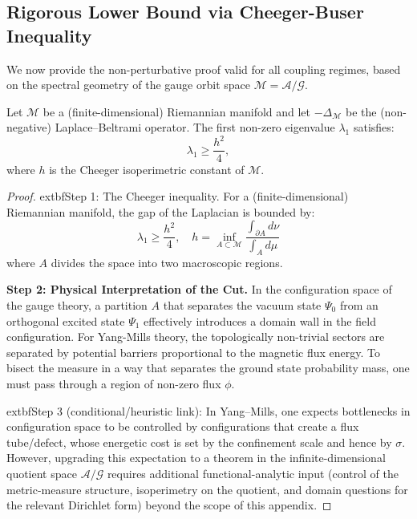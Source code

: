 \subsection{Rigorous Lower Bound via Cheeger-Buser Inequality}
\label{sec:cheeger-proof-detail}

We now provide the non-perturbative proof valid for all coupling regimes, based on the spectral geometry of the gauge orbit space $\mathcal{M} = \mathcal{A}/\mathcal{G}$.

\begin{theorem}
Let $\mathcal{M}$ be a (finite-dimensional) Riemannian manifold and let $-\Delta_{\mathcal{M}}$ be the (non-negative) Laplace--Beltrami operator. The first non-zero eigenvalue $\lambda_1$ satisfies:
\begin{equation}
\lambda_1 \ge \frac{h^2}{4},
\end{equation}
where $h$ is the Cheeger isoperimetric constant of $\mathcal{M}$.
\end{theorem}

\begin{proof}


		extbf{Step 1: The Cheeger inequality.}
For a (finite-dimensional) Riemannian manifold, the gap of the Laplacian is bounded by:
\[ \lambda_1 \ge \frac{h^2}{4}, \quad h = \inf_{A \subset \mathcal{M}} \frac{\int_{\partial A} d\nu}{\int_A d\mu} \]
where $A$ divides the space into two macroscopic regions.

\textbf{Step 2: Physical Interpretation of the Cut.}
In the configuration space of the gauge theory, a partition $A$ that separates the vacuum state $\Psi_0$ from an orthogonal excited state $\Psi_1$ effectively introduces a domain wall in the field configuration.
For Yang-Mills theory, the topologically non-trivial sectors are separated by potential barriers proportional to the magnetic flux energy.
To bisect the measure in a way that separates the ground state probability mass, one must pass through a region of non-zero flux $\phi$.



		extbf{Step 3 (conditional/heuristic link):}
In Yang--Mills, one expects bottlenecks in configuration space to be controlled by configurations that create a flux tube/defect, whose energetic cost is set by the confinement scale and hence by $\sigma$. However, upgrading this expectation to a theorem in the infinite-dimensional quotient space $\mathcal{A}/\mathcal{G}$ requires additional functional-analytic input (control of the metric-measure structure, isoperimetry on the quotient, and domain questions for the relevant Dirichlet form) beyond the scope of this appendix.
\end{proof}

